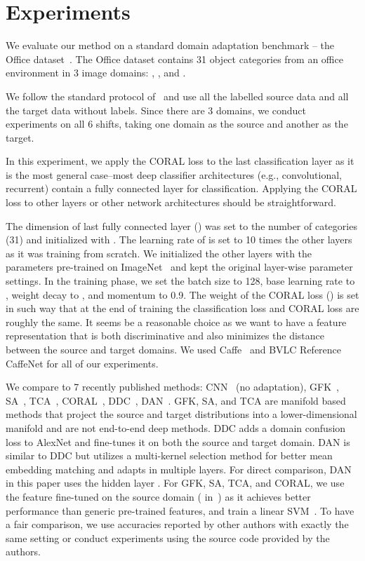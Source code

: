  \section{Experiments}
\label{sec:exp}

We evaluate our method on a standard domain adaptation benchmark -- the Office dataset~\cite{saenko2010adapting}. The Office dataset contains 31 object categories from an office environment in 3 image domains: , ,  and . 

We follow the standard protocol of~\cite{gfk,dan_long15,decaf,tzeng_arxiv15,reversegrad} and use all the labelled source data and all the target data without labels. 
Since there are 3 domains, we conduct experiments on all 6 shifts, taking one domain as the source and another as the target. 

In this experiment, we apply the CORAL loss to the last classification layer
as it is the most general case--most deep classifier architectures (e.g., convolutional, recurrent) contain a fully connected layer for classification. Applying the CORAL loss to other layers or other network architectures should be straightforward. 

The dimension of last fully connected layer () was set to the number of categories (31) and initialized with . The learning rate of  is set to 10 times the other layers as it was training from scratch. We initialized the other layers with the parameters pre-trained on ImageNet~\cite{imagenet} and kept the original layer-wise parameter settings. In the training phase, we set the batch size to 128, base learning rate to , weight decay to , and momentum to 0.9. The weight of the CORAL loss () is set in such way that at the end of training the classification loss and CORAL loss are roughly the same. It seems be a reasonable choice as we want to have a feature representation that is both discriminative and also minimizes the distance between the source and target domains. We used Caffe~\cite{caffe} and BVLC Reference CaffeNet for all of our experiments.

We compare to 7 recently published methods: CNN~\cite{alexnet} (no adaptation), GFK~\cite{gfk}, SA~\cite{sa}, TCA~\cite{tca}, CORAL~\cite{coral}, DDC~\cite{tzeng_arxiv15}, DAN~\cite{dan_long15}. GFK, SA, and TCA are manifold based methods that project the source and target distributions into a lower-dimensional manifold and are not end-to-end deep methods. DDC adds a domain confusion loss to AlexNet and fine-tunes it on both the source and target domain. DAN is similar to DDC but utilizes a multi-kernel selection method for better mean embedding matching and adapts in multiple layers. For direct comparison, DAN in this paper uses the hidden layer . For GFK, SA, TCA, and CORAL, we use the  feature fine-tuned on the source domain ( in~\cite{coral}) as it achieves better performance than generic pre-trained features, and train a linear SVM~\cite{sa,coral}. To have a fair comparison, we use accuracies reported by other authors with exactly the same setting or conduct experiments using the source code provided by the authors.


